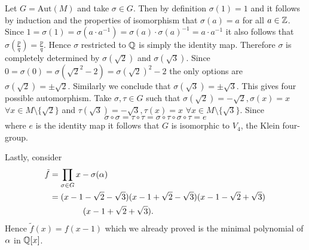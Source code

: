 \begin{sol}
        Let $G=\text{Aut}(M)$ and take $\sigma\in G$. Then by definition $\sigma(1)=1$ and it follows by induction and the properties of isomorphism that $\sigma(a)=a$ for all $a\in\mathbb{Z}$.
        Since $1=\sigma(1)=\sigma(a\cdot a^{-1})=\sigma(a)\cdot\sigma(a)^{-1}=a\cdot a^{-1}$ it also follows that $\sigma\left(\frac{p}{q}\right)=\frac{p}{q}$. 
        Hence $\sigma$ restricted to $\mathbb{Q}$ is simply the identity map. 
        Therefore $\sigma$ is completely determined by $\sigma(\sqrt{2})$ and $\sigma(\sqrt{3})$.
        Since $0=\sigma(0)=\sigma(\sqrt{2}^2-2)=\sigma(\sqrt{2})^2-2$ the only options are $\sigma(\sqrt{2})=\pm\sqrt{2}$.
        Similarly we conclude that $\sigma(\sqrt{3})=\pm\sqrt{3}$. This gives four possible automorphism.
        Take $\sigma,\tau\in G$ such that $\sigma(\sqrt{2})=-\sqrt{2}, \sigma(x)=x$ $\forall x\in M\setminus\{\sqrt{2}\}$ and $\tau(\sqrt{3})=-\sqrt{3},\tau(x)=x$ $\forall x\in M\setminus\{\sqrt{3}\}$. 
        Since 
        $$\sigma\circ\sigma=\tau\circ\tau=\sigma\circ\tau\circ\sigma\circ\tau=e$$
        where $e$ is the identity map it follows that $G$ is isomorphic to $V_4$, the Klein four-group.

        Lastly, consider
        \begin{align*}
            \tilde{f}&=\prod_{\sigma\in G}x-\sigma(\alpha)\\
            &=(x-1-\sqrt{2}-\sqrt{3})(x-1+\sqrt{2}-\sqrt{3})(x-1-\sqrt{2}+\sqrt{3})\\&\qquad\qquad (x-1+\sqrt{2}+\sqrt{3}).
        \end{align*}
        Hence $\tilde{f}(x)=f(x-1)$ which we already proved is the minimal polynomial of $\alpha$ in $\mathbb{Q}[x]$.

    \end{sol}

